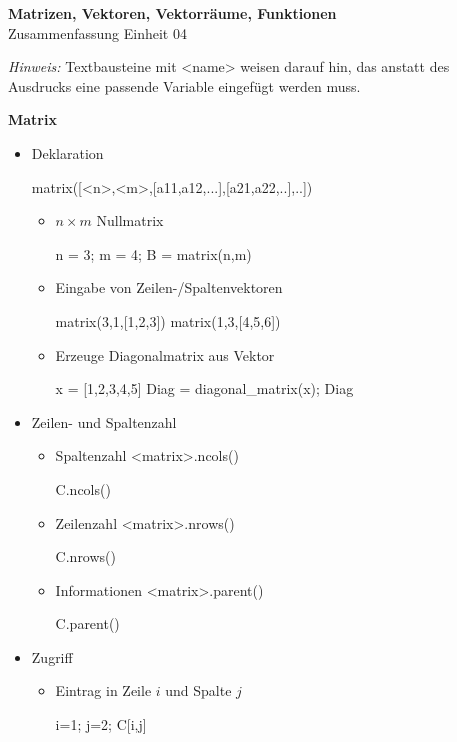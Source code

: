 \documentclass[a4paper,9pt,DIV15,twocolumn]{scrartcl}
\begin{document}
\begin{center}
    \textbf{\LARGE Matrizen, Vektoren, Vektorräume, Funktionen}\\
    {\large Zusammenfassung Einheit 04}
\end{center}
\textsl{Hinweis:} Textbausteine mit <name> weisen darauf hin, das anstatt des Ausdrucks eine passende Variable eingefügt werden muss.

\medskip
\textbf{Matrix}
\begin{itemize}
\item Deklaration
\begin{sagein}
matrix([<n>,<m>,[a11,a12,...],[a21,a22,..],..])
\end{sagein}
\begin{itemize}
\item $n\times m$ Nullmatrix
\begin{sagein}
n = 3; m = 4; B = matrix(n,m)
\end{sagein}
\item Eingabe von Zeilen-/Spaltenvektoren
\begin{sagein}
matrix(3,1,[1,2,3])
matrix(1,3,[4,5,6])
\end{sagein}
\item Erzeuge Diagonalmatrix aus Vektor
\begin{sagein}
x = [1,2,3,4,5]
Diag = diagonal_matrix(x); Diag
\end{sagein}
\end{itemize}
\item Zeilen- und Spaltenzahl
\begin{itemize}
 \item Spaltenzahl <matrix>.ncols()
\begin{sagein}
C.ncols()
\end{sagein}
\item Zeilenzahl <matrix>.nrows()
\begin{sagein}
C.nrows()
\end{sagein}
\item Informationen <matrix>.parent()
\begin{sagein}
C.parent()
\end{sagein}
\end{itemize}
\item Zugriff
\begin{itemize}
 \item Eintrag in Zeile $i$ und Spalte $j$
\begin{sagein}
i=1; j=2; C[i,j]
\end{sagein}

\end{itemize}
\end{itemize}
\end{document}
